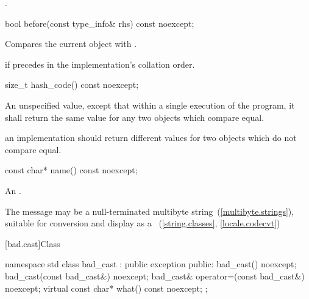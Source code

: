 \begin{itemdescr}
\pnum
\returns
{}.
\end{itemdescr}

%
\begin{itemdecl}
bool before(const type_info& rhs) const noexcept;
\end{itemdecl}

\begin{itemdescr}
\pnum
\effects
Compares the current object with .

\pnum
\returns
{}
if
precedes  in the implementation's collation order.
\end{itemdescr}

%
\begin{itemdecl}
size_t hash_code() const noexcept;
\end{itemdecl}

\begin{itemdescr}
\pnum
\returns An unspecified value, except that within a single execution of the
program, it shall return the same value for any two 
objects which compare equal.

\pnum
\remark an implementation should return different values for two
 objects which do not compare equal.
\end{itemdescr}


%
\begin{itemdecl}
const char* name() const noexcept;
\end{itemdecl}

\begin{itemdescr}
\pnum
\returns
An  \ntbs.

\pnum
\notes
The message may be a null-terminated multibyte string~(\ref{multibyte.strings}),
suitable for conversion and display as a
~(\ref{string.classes}, \ref{locale.codecvt})
\end{itemdescr}

[bad.cast]{Class }

%
\begin{codeblock}
namespace std {
  class bad_cast : public exception {
  public:
    bad_cast() noexcept;
    bad_cast(const bad_cast&) noexcept;
    bad_cast& operator=(const bad_cast&) noexcept;
    virtual const char* what() const noexcept;
  };
}
\end{codeblock}

